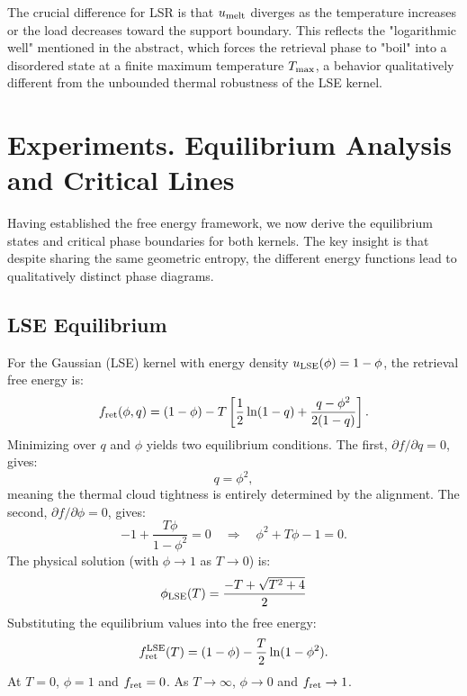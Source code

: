 \documentclass{article}
\theoremstyle{plain}
\theoremstyle{definition}
\theoremstyle{remark}
\begin{document}
The crucial difference for LSR is that $u_{\rm melt}$ diverges as the temperature increases or the load decreases toward the support boundary. This reflects the "logarithmic well" mentioned in the abstract, which forces the retrieval phase to "boil" into a disordered state at a finite maximum temperature $T_{\rm max}$, a behavior qualitatively different from the unbounded thermal robustness of the LSE kernel.



\section{Experiments. Equilibrium Analysis and Critical Lines}

Having established the free energy framework, we now derive the equilibrium states and critical phase boundaries for both kernels. The key insight is that despite sharing the same geometric entropy, the different energy functions lead to qualitatively distinct phase diagrams.

\subsection{LSE Equilibrium}

For the Gaussian (LSE) kernel with energy density $u_{\rm LSE}(\phi) = 1 - \phi$, the retrieval free energy is:
\begin{equation}
    f_{\rm ret}(\phi, q) = (1 - \phi) - T \left[ \frac{1}{2}\ln(1-q) + \frac{q - \phi^2}{2(1-q)} \right].
\end{equation}
Minimizing over $q$ and $\phi$ yields two equilibrium conditions. The first, $\partial f/\partial q = 0$, gives:
\begin{equation}
    q = \phi^2,
    \label{eq:q_constraint}
\end{equation}
meaning the thermal cloud tightness is entirely determined by the alignment. The second, $\partial f/\partial \phi = 0$, gives:
\begin{equation}
    -1 + \frac{T\phi}{1-\phi^2} = 0 \quad \Rightarrow \quad \phi^2 + T\phi - 1 = 0.
\end{equation}
The physical solution (with $\phi \to 1$ as $T \to 0$) is:
\begin{equation}
    \phi_{\rm LSE}(T) = \frac{-T + \sqrt{T^2 + 4}}{2}
    \label{eq:phi_lse}
\end{equation}
Substituting the equilibrium values into the free energy:
\begin{equation}
    f_{\rm ret}^{\rm LSE}(T) = (1 - \phi) - \frac{T}{2}\ln(1 - \phi^2).
    \label{eq:f_lse}
\end{equation}
At $T = 0$, $\phi = 1$ and $f_{\rm ret} = 0$. As $T \to \infty$, $\phi \to 0$ and $f_{\rm ret} \to 1$.
\end{document}
